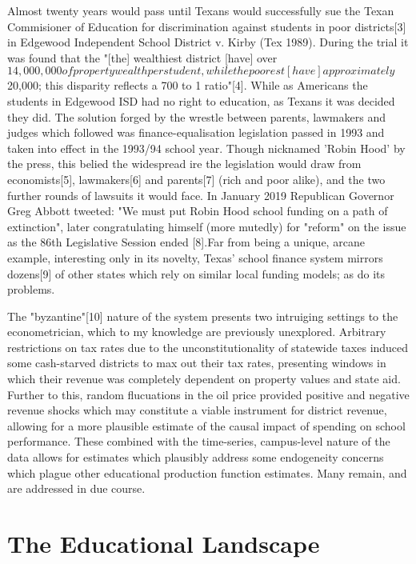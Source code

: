 \documentclass[11pt]{article}
\begin{document}
Almost twenty years would pass until Texans would successfully sue the Texan Commisioner of Education for discrimination against students in poor districts[3] in Edgewood Independent School District v. Kirby (Tex 1989). During the trial it was found that the "[the] wealthiest district [have] over $ 14,000,000 of property wealth per student, while the poorest [have] approximately $ 20,000; this disparity reflects a 700 to 1 ratio"[4]. While as Americans the students in Edgewood ISD had no right to education, as Texans it was decided they did. The solution forged by the wrestle between parents, lawmakers and judges which followed was finance-equalisation legislation passed in 1993 and taken into effect in the 1993/94 school year. Though nicknamed 'Robin Hood' by the press, this belied the widespread ire the legislation would draw from economists[5], lawmakers[6] and parents[7] (rich and poor alike), and the two further rounds of lawsuits it would face. In January 2019 Republican Governor Greg Abbott tweeted: "We must put Robin Hood school funding on a path of extinction", later congratulating himself (more mutedly) for "reform" on the issue as the 86th Legislative Session ended [8].Far from being a unique, arcane example, interesting only in its novelty, Texas' school finance system mirrors dozens[9] of other states which rely on similar local funding models; as do its problems. 

The "byzantine"[10] nature of the system presents two intruiging settings to the econometrician, which to my knowledge are previously unexplored. Arbitrary restrictions on tax rates due to the unconstitutionality of statewide taxes induced some cash-starved districts to max out their tax rates, presenting windows in which their revenue was completely dependent on property values and state aid. Further to this, random flucuations in the oil price provided positive and negative revenue shocks which may constitute a viable instrument for district revenue, allowing for a more plausible estimate of the causal impact of spending on school performance. These combined with the time-series, campus-level nature of the data allows for estimates which plausibly address some endogeneity concerns which plague other educational production function estimates. Many remain, and are addressed in due course. 


\section{The Educational Landscape}
\label{s:next}
\end{document}
